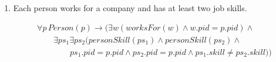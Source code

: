 \documentclass{article}
\begin{document}
\begin{enumerate}[resume]
%
%
%
%
%
%
%
%
%

\item  Each person works for a company and has at least two job skills.

$$
\begin{array}{l}
\forall p\, Person (p) \rightarrow (\exists w (worksFor(w) \land w.pid = p.pid) \land \\
\qquad  \exists ps_1\exists ps_2 (personSkill(ps_1)\land personSkill(ps_2) \land \\
\qquad \qquad ps_1.pid = p.pid \land ps_2.pid = p.pid \land ps_1.skill \neq ps_2.skill))
\end{array}
$$


\end{enumerate}
\end{document}
